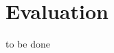 \section{Evaluation}
\label{sec.evaluation}

to be done

\begin{comment}

ROM RAM loc tok bytes gzipped

quantitative
memory, expressiveness

qualitative
battery, safety, expressiveness, responsiveness

Similar evaluation in a previous work \cite{wsn.sol}.

We make extensive use of macros.
\CEU{} has a good composibility XXX.

\footnote{
In order to adapt, as they are imported with a single \texttt{include} macro 
call.
Shared without any changes or specific copies into the source, just a call to 
the \texttt{include} macro of the \emph{m4 processor}.
}

(~A || ~B || ~C || ~D)
qual o tamanho disso??
automatic bookkeeping (creation/start/destroy)/ stack / shceduling
in one line, create/spawn 4 threads, once any of them terminate, kill the 
others
expressive and also efficient, theres no int representation of a "thread" with 
an structure with state in CEU
just set flags/gates

coarse grained vs fine grained multithreading

auto book allows fine-graining

ceu is stackless

also syntactic support

SOL, heavy syntax, what about additional space(stack)

falar de composibility

comparacao como artigo HIGH
incluir linhas de codigo

bateria, uso de memoria igual, a nao ser que o programa perca tempo em coisas 
que os outros nao fazem
em relacao a threads, no context switch
mesmo para os asyncs nao ha context switch
no run-time overheads due to threads creation/destroy, just set flags

bateria / memory ==> code size
expressiveness   ==> parallel compositions, FRP - lines of code
responsiveness   ==> no loops, asyncs
safety           ==> temporal analysis, no memory alloc, no stack, determinism, 
no loops

memory / total / ram

battery

processing
\end{comment}

